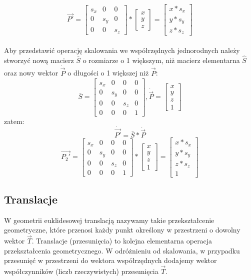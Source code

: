 \documentclass[licencjacka]{pracamgr}
\begin{document}
$$
\vec{P'}
=
\begin{bmatrix}
s_x & 0 & 0 \\
0 & s_y & 0 \\
0 & 0 & s_z
\end{bmatrix}
*
\begin{bmatrix} 
x \\ 
y \\ 
z 
\end{bmatrix} 
=
\begin{bmatrix} 
x*s_x \\ 
y*s_y \\ 
z*s_z 
\end{bmatrix}
$$
\\
Aby przedstawić operację skalowania we współrzędnych jednorodnych należy stworzyć nową macierz $\bar{S}$ o rozmiarze o 1 większym, niż macierz elementarna $\hat{S}$ oraz nowy wektor $\dot{\vec{P}}$ o długości o 1 większej niż $\vec{P}$:
$$
\bar{S} 
= 
\begin{bmatrix}
s_x & 0 & 0 & 0 \\
0 & s_y & 0 & 0 \\
0 & 0 & s_z & 0 \\
0 & 0 & 0 & 1
\end{bmatrix}
, 
\dot{\vec{P}}
=
\begin{bmatrix} 
x \\ 
y \\ 
z \\
1
\end{bmatrix} 
$$
zatem:
$$
\dot{\vec{P'}}=\bar{S}*\dot{\vec{P}}
$$
$$
\vec{P_2'} = 
\begin{bmatrix}
s_x & 0 & 0 & 0 \\
0 & s_y & 0 & 0 \\
0 & 0 & s_z & 0 \\
0 & 0 & 0 & 1
\end{bmatrix}
*
\begin{bmatrix} 
x \\ 
y \\ 
z \\
1
\end{bmatrix} 
=
\begin{bmatrix} 
x*s_x \\ 
y*s_y \\ 
z*s_z \\
1
\end{bmatrix}
$$

\subsection{Translacje}
W geometrii euklidesowej translacją nazywamy takie przekształcenie geometryczne, które przenosi każdy punkt określony w przestrzeni o dowolny wektor $\vec{T}$. Translacje (przesunięcia) to kolejna elementarna operacja przekształcenia geometrycznego. W odróżnieniu od skalowania, w przypadku przesunięć w przestrzeni do wektora współrzędnych dodajemy wektor współczynników (liczb rzeczywistych) przesunięcia $\vec{T}$.
\end{document}
